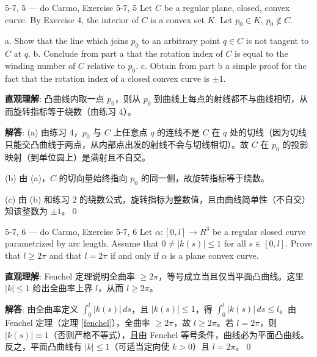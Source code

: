 \begin{exercise}{5-7, 5 — do Carmo, Exercise 5-7, 5}
Let $C$ be a regular plane, closed, convex curve. By Exercise 4, the interior of $C$ is a convex set $K$. Let $p_0 \in K$, $p_0 \notin C$.

a. Show that the line which joins $p_0$ to an arbitrary point $q \in C$ is not tangent to $C$ at $q$.
b. Conclude from part a that the rotation index of $C$ is equal to the winding number of $C$ relative to $p_0$.
c. Obtain from part b a simple proof for the fact that the rotation index of a closed convex curve is $\pm 1$.
\end{exercise}
\begin{solution}
\textbf{直观理解}: 凸曲线内取一点 $p_0$，则从 $p_0$ 到曲线上每点的射线都不与曲线相切，从而旋转指标等于绕数（由练习 4）。

\textbf{解答}: (a) 由练习 4，$p_0$ 与 $C$ 上任意点 $q$ 的连线不是 $C$ 在 $q$ 处的切线（因为切线只能交凸曲线于两点，从内部点出发的射线不会与切线相切）。故 $C$ 在 $p_0$ 的投影映射（到单位圆上）是满射且不自交。

(b) 由 (a)，$C$ 的切向量始终指向 $p_0$ 的同一侧，故旋转指标等于绕数。

(c) 由 (b) 和练习 2 的绕数公式，旋转指标为整数值，且由曲线简单性（不自交）知该整数为 $\pm 1$。\qed
\end{solution}

\begin{exercise}{5-7, 6 — do Carmo, Exercise 5-7, 6}
Let $\alpha \colon [0, l] \to R^3$ be a regular closed curve parametrized by arc length. Assume that $0 \neq |k(s)| \leq 1$ for all $s \in [0, l]$. Prove that $l \geq 2\pi$ and that $l = 2\pi$ if and only if $\alpha$ is a plane convex curve.
\end{exercise}
\begin{solution}
\textbf{直观理解}: Fenchel 定理说明全曲率 $\geq 2\pi$，等号成立当且仅当平面凸曲线。这里 $|k|\leq 1$ 给出全曲率上界 $l$，从而 $l\geq 2\pi$。

\textbf{解答}: 由全曲率定义 $\int_0^l |k(s)|\,ds$，且 $|k(s)|\leq 1$，得 $\int_0^l |k(s)|\,ds\leq l$。由 Fenchel 定理（定理 \ref{fenchel}），全曲率 $\geq 2\pi$，故 $l\geq 2\pi$。若 $l=2\pi$，则 $|k(s)|\equiv 1$（否则严格不等式），且由 Fenchel 等号条件，曲线必为平面凸曲线。反之，平面凸曲线有 $|k|\leq 1$（可适当定向使 $k>0$）且 $l=2\pi$。\qed
\end{solution}

